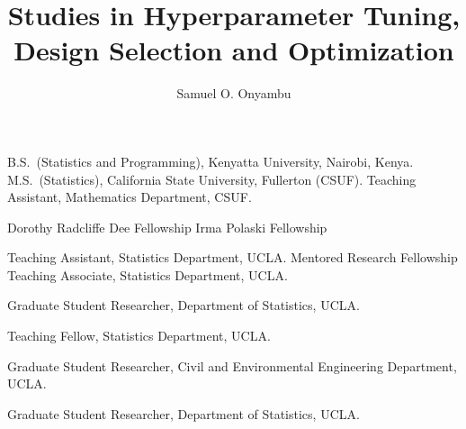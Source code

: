 


\title {Studies in Hyperparameter Tuning, Design Selection and Optimization}

\author{Samuel O. Onyambu}








\dedication{\textsl{To my parents, Joseph and Jane, ---\\  
          my siblings, Tabitha, Naomi, Jasper, and Lilian,---\\  
          and my dear friends, Taylor and Justin,---\\  
          who among so many other things ensured that I gave my all to accomplish this task.}
}


                {B.S.~(Statistics and Programming), Kenyatta University, Nairobi, Kenya.}
                {M.S.~(Statistics), California State University, Fullerton (CSUF).}
                {Teaching Assistant, Mathematics Department, CSUF.}

  {Dorothy Radcliffe Dee Fellowship}
   {Irma Polaski Fellowship}


               {Teaching Assistant, Statistics Department, UCLA.}
 {Mentored Research Fellowship}
               {Teaching Associate, Statistics Department, UCLA.} 

                {Graduate Student Researcher, Department of Statistics, UCLA.}

 {Teaching Fellow, Statistics Department, UCLA.} 

                {Graduate Student Researcher, Civil and Environmental Engineering Department, UCLA.}

                {Graduate Student Researcher, Department of Statistics, UCLA.}


\clearpage




